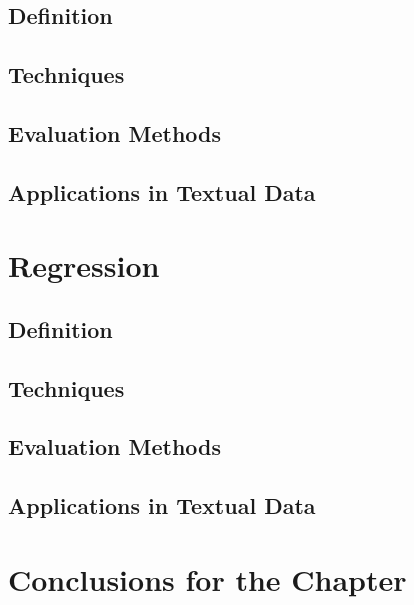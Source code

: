 \subsection{Definition}

\subsection{Techniques}

\subsection{Evaluation Methods}

\subsection{Applications in Textual Data}

\section{Regression}

\subsection{Definition}

\subsection{Techniques}

\subsection{Evaluation Methods}


\subsection{Applications in Textual Data}


\section{Conclusions for the Chapter}
